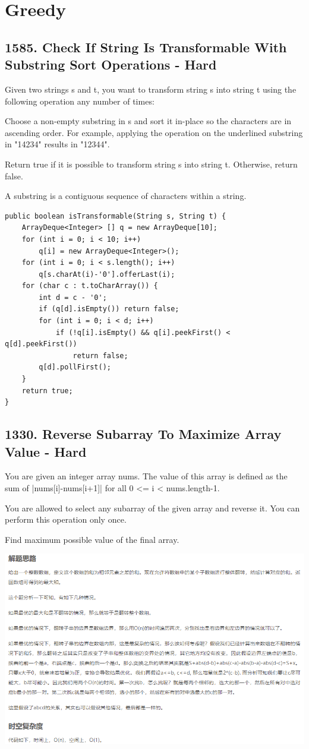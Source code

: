 \documentclass[9pt, b5paaper]{book}
\begin{document}
\chapter{Greedy}
\label{sec-10}
\section{1585. Check If String Is Transformable With Substring Sort Operations - Hard}
\label{sec-10-1}
Given two strings s and t, you want to transform string s into string t using the following operation any number of times:

Choose a non-empty substring in s and sort it in-place so the characters are in ascending order.
For example, applying the operation on the underlined substring in "14234" results in "12344".

Return true if it is possible to transform string s into string t. Otherwise, return false.

A substring is a contiguous sequence of characters within a string.
\begin{verbatim}
public boolean isTransformable(String s, String t) { 
    ArrayDeque<Integer> [] q = new ArrayDeque[10];
    for (int i = 0; i < 10; i++) 
        q[i] = new ArrayDeque<Integer>();
    for (int i = 0; i < s.length(); i++) 
        q[s.charAt(i)-'0'].offerLast(i);
    for (char c : t.toCharArray()) {
        int d = c - '0';
        if (q[d].isEmpty()) return false;
        for (int i = 0; i < d; i++) 
            if (!q[i].isEmpty() && q[i].peekFirst() < q[d].peekFirst())
                return false;
        q[d].pollFirst();
    }
    return true;
}
\end{verbatim}

\section{1330. Reverse Subarray To Maximize Array Value - Hard}
\label{sec-10-2}
You are given an integer array nums. The value of this array is defined as the sum of |nums[i]-nums[i+1]| for all 0 <= i < nums.length-1.

You are allowed to select any subarray of the given array and reverse it. You can perform this operation only once.

Find maximum possible value of the final array.

\includegraphics[width=.9\linewidth]{./pic/reverseSubarray.png}
\end{document}
